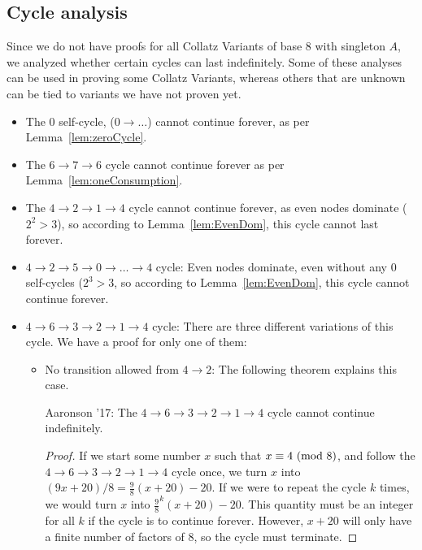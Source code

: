 \subsection{Cycle analysis} \label{subsubsec:cycleanalysis}
Since we do not have proofs for all Collatz Variants of base 8 with singleton $A$, we analyzed whether certain cycles can last indefinitely. Some of these analyses can be used in proving some Collatz Variants, whereas others that are unknown can be tied to variants we have not proven yet.
\begin{itemize}
    \item The 0 self-cycle, ($0  \rightarrow \ldots$) cannot continue forever, as per Lemma~\ref{lem:zeroCycle}.
    \item The $6 \rightarrow 7 \rightarrow 6$ cycle cannot continue forever as per Lemma~\ref{lem:oneConsumption}.
    \item The $4 \rightarrow 2 \rightarrow 1 \rightarrow 4$ cycle cannot continue forever, as even nodes dominate ($2^2 > 3$), so according to Lemma~\ref{lem:EvenDom}, this cycle cannot last forever.
    \item $4 \rightarrow 2 \rightarrow 5 \rightarrow 0  \rightarrow \ldots \rightarrow 4$ cycle:  Even nodes dominate, even without any 0 self-cycles ($2^3 > 3$, so according to Lemma~\ref{lem:EvenDom}, this cycle cannot continue forever.
    \item $4 \rightarrow 6 \rightarrow 3 \rightarrow 2 \rightarrow 1 \rightarrow 4$ cycle: There are three different variations of this cycle. We have a proof for only one of them:
\begin{itemize}
  \item No transition allowed from $4 \rightarrow 2$: The following theorem explains this case.
  \begin{theorem} Aaronson '17: The $4 \rightarrow 6 \rightarrow 3 \rightarrow 2 \rightarrow 1 \rightarrow 4$ cycle cannot continue indefinitely.
  \end{theorem}
  \begin{proof}
    If we start some number $x$ such that $x \equiv 4\ (\mathrm{mod}\ 8)$, and follow the $4 \rightarrow 6 \rightarrow 3 \rightarrow 2 \rightarrow 1 \rightarrow 4$ cycle once, we turn $x$ into $(9x+20)/8 = \frac{9}{8}(x+20)-20$. If we were to repeat the cycle $k$ times, we would turn $x$ into $\frac{9}{8}^k(x+20)-20$. This quantity must be an integer for all $k$ if the cycle is to continue forever. However, $x+20$ will only have a finite number of factors of 8, so the cycle must terminate.
  \end{proof}

\end{itemize}
\end{itemize}
